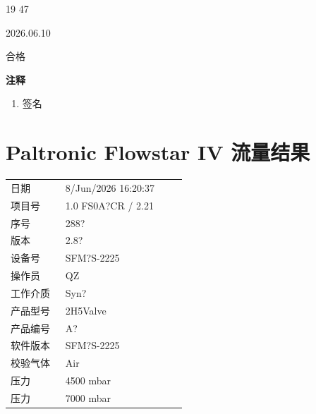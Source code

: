 \documentclass[UTF8,10pt,a4paper,fontset=fandol]{ctexart}
\newcommand{\fieldvalue}[1]{#1}
\newcommand{\handwritten}[1]{#1}
\begin{document}
\vspace{1em}

\handwritten{19 47}

\handwritten{2026.06.10}

\fieldvalue{\handwritten{合格}}

\noindent
\textbf{注释}

\begin{enumerate}
\item 签名
\end{enumerate}


\newpage

\section{Paltronic Flowstar IV 流量结果}

\begin{tabular}{@{}p{0.28\linewidth}p{0.62\linewidth}@{}}
日期 &
\fieldvalue{8/Jun/2026 16:20:37}
\\
项目号 &
\fieldvalue{1.0 FS0A?CR / 2.21}
\\
序号 &
\fieldvalue{288?}
\\
版本 &
\fieldvalue{2.8?}
\\
设备号 &
\fieldvalue{SFM?S-2225}
\\
操作员 &
\fieldvalue{QZ}
\\
工作介质 &
\fieldvalue{Syn?}
\\
产品型号 &
\fieldvalue{2H5Valve}
\\
产品编号 &
\fieldvalue{A?}
\\
软件版本 &
\fieldvalue{SFM?S-2225}
\\
校验气体 &
\fieldvalue{Air}
\\
压力 &
\fieldvalue{4500 mbar}
\\
压力 &
\fieldvalue{7000 mbar}
\\
\end{tabular}
\end{document}
